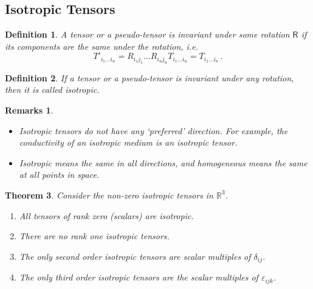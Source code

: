 \documentclass{article}
\theoremstyle{plain}\theoremheaderfont{\normalfont\itshape}\theorembodyfont{\rmfamily}\theoremseparator{.}\newtheorem*{rem}{Remark}\newtheorem*{ex}{Example}\newtheorem*{proof}{Proof}\newtheorem*{altp}{Alternative proof}
\theoremstyle{plain}\theoremheaderfont{\normalfont\bfseries}\theorembodyfont{\rmfamily}\theoremseparator{.}\newtheorem{thm}{Theorem}[section]\newtheorem{lem}[thm]{Lemma}\newtheorem{prop}[thm]{Proposition}\newtheorem*{cor}{Corollary}\newtheorem{defn}[thm]{Definition}\newtheorem{clm}[thm]{Claim}\newtheorem{clminproof}{Claim}
\theoremstyle{break}\theoremheaderfont{\normalfont\itshape}\theorembodyfont{\rmfamily}\theoremseparator{.\medskip}\newtheorem*{proofskip}{Proof}\newtheorem*{exs}{Examples}\newtheorem*{rems}{Remarks}
\theoremstyle{break}\theoremheaderfont{\normalfont\bfseries}\theorembodyfont{\rmfamily}\theoremseparator{.\medskip}\newtheorem{lemskip}[thm]{Lemma}\newtheorem{defnskip}[thm]{Definition}\newtheorem{propskip}[thm]{Proposition}\newtheorem{thmskip}[thm]{Theorem}
\numberwithin{equation}{section}
\begin{document}
	\subsection{Isotropic Tensors}
	\begin{defn}
		A tensor or a pseudo-tensor is \textit{invariant} under some rotation \(\mathsf{R}\) if its components are the same under the rotation, i.e.
		\[T'_{i_1\dots i_n}=R_{i_1j_1}\dots R_{i_nj_n}T_{i_1\dots i_n}=T_{i_1\dots i_n}\,.\]
	\end{defn}
	\begin{defn}
		If a tensor or a pseudo-tensor is invariant under any rotation, then it is called \textit{isotropic}.
	\end{defn}
	\begin{rems}
		\begin{itemize}[topsep=0pt]
			\item Isotropic tensors do not have any `preferred' direction. For example, the conductivity of an isotropic medium is an isotropic tensor.
			\item \textit{Isotropic} means the same in all directions, and \textit{homogeneous} means the same at all points in space.
		\end{itemize}
	\end{rems}
	\begin{thm}
		Consider the non-zero isotropic tensors in \(\mathbb{R}^3\).
		\begin{enumerate}[topsep=0pt]
			\item All tensors of rank zero (scalars) are isotropic.
			\item There are no rank one isotropic tensors.
			\item The only second order isotropic tensors are scalar multiples of \(\delta_{ij}\).
			\item The only third order isotropic tensors are the scalar multiples of \(\varepsilon_{ijk}\). 
		\end{enumerate}
	\end{thm}
\end{document}
